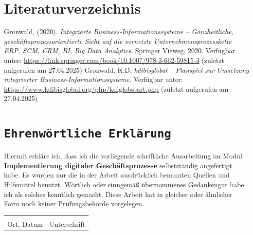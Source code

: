 \documentclass[a4paper,12pt]{article}
\begin{document}
\section*{Literaturverzeichnis}
\begin{thebibliography}{99}
     Gronwald, (2020). \textit{Integrierte Business-Informationssysteme – Ganzheitliche, geschäftsprozessorientierte Sicht auf die vernetzte Unternehmensprozesskette ERP, SCM, CRM, BI, Big Data Analytics}. Springer Vieweg, 2020. Verfügbar unter: \url{https://link.springer.com/book/10.1007/978-3-662-59815-3} (zuletzt aufgerufen am 27.04.2025)
     Gronwald, K.D. \textit{kdibisglobal – Planspiel zur Umsetzung integrierter Business-Informationssysteme}. Verfügbar unter: \url{https://www.kdibisglobal.org/php/kdiglobstart.php} (zuletzt aufgerufen am 27.04.2025)
\end{thebibliography}


\newpage

\newpage
{}
\section*{\texttt{Ehrenwörtliche Erklärung}}
Hiermit erkläre ich, dass ich die vorliegende schriftliche Ausarbeitung im Modul \textbf{Implementierung digitaler Geschäftsprozesse} selbstständig
angefertigt habe. Es wurden nur die in der Arbeit ausdrücklich benannten Quellen und
Hilfsmittel benutzt. Wörtlich oder sinngemäß übernommenes Gedankengut habe ich als
solches kenntlich gemacht. Diese Arbeit hat in gleicher oder ähnlicher Form noch keiner
Prüfungsbehörde vorgelegen.

\vspace{3cm}
\noindent\begin{tabular}{p{}p{}}
    \hrulefill & \hrulefill \\
    Ort, Datum & Unterschrift \\
\end{tabular}
\end{document}
